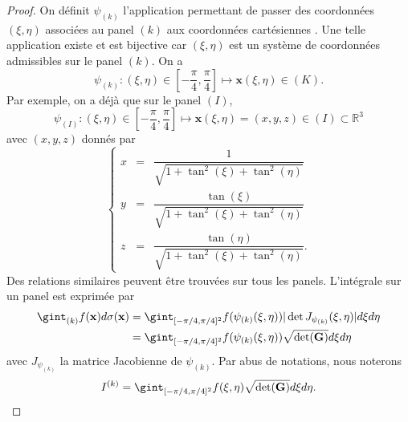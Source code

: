 \begin{proof}
On définit $\psi_{(k)}$ l'application permettant de passer des coordonnées $(\xi, \eta)$ associées au panel $(k)$ aux coordonnées cartésiennes . Une telle application existe et est bijective car $(\xi, \eta)$ est un système de coordonnées admissibles sur le panel $(k)$. On a
\begin{equation}
\psi_{(k)} : (\xi, \eta) \in \left[ - \dfrac{\pi}{4}, \dfrac{\pi}{4} \right] \mapsto \mathbf{x}(\xi, \eta) \in (K).
\end{equation}
Par exemple, on a déjà que sur le panel $(I)$,
\begin{equation}
\psi_{(I)} : (\xi, \eta) \in \left[ - \dfrac{\pi}{4}, \dfrac{\pi}{4} \right] \mapsto \mathbf{x}(\xi, \eta) = (x,y,z) \in (I) \subset \mathbb{R}^3
\end{equation}
avec $(x,y,z)$ donnés par
\begin{equation}
\left\lbrace
\begin{array}{rcl}
x & = & \dfrac{1}{\sqrt{1 + \tan^2 (\xi) + \tan^2 (\eta)}} \\
y & = & \dfrac{\tan (\xi)}{\sqrt{1 + \tan^2 (\xi) + \tan^2 (\eta)}} \\
z & = & \dfrac{\tan ( \eta )}{\sqrt{1 + \tan^2 (\xi) + \tan^2 (\eta)}}.
\end{array}
\right.
\end{equation}
Des relations similaires peuvent être trouvées sur tous les panels. L'intégrale sur un panel est exprimée par
\begin{align*}
\gint_{(k)} f(\mathbf{x}) d \sigma(\mathbf{x}) & = \gint_{[-\pi/4, \pi/4]^2} f(\psi_{(k)}(\xi, \eta)) |\det J_{\psi_{(k)}}(\xi, \eta)| d\xi d\eta \\
	&  = \gint_{[-\pi/4, \pi/4]^2} f(\psi_{(k)}(\xi, \eta)) \sqrt{\det (\mathbf{G})} d\xi d\eta \\
\end{align*}
avec $J_{\psi_{(k)}}$ la matrice Jacobienne de $\psi_{(k)}$. Par abus de notations, nous noterons
\begin{equation}
I^{(k)} = \gint_{[-\pi/4, \pi/4]^2} f(\xi, \eta) \sqrt{\det (\mathbf{G})} d\xi d\eta.
\end{equation}
\end{proof}


